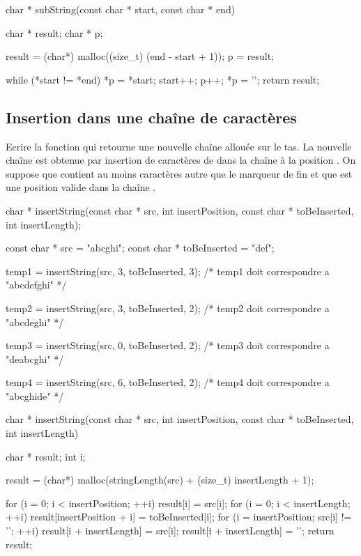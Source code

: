 \begin{csourcecorrection}
char * subString(const char * start, const char * end) {
    char * result;
    char * p;

    result = (char*) malloc((size_t) (end - start + 1));
    p = result;

    while (*start != *end) {
        *p = *start;
        start++;
        p++;
    }
    *p = '\0';
    return result;
}
\end{csourcecorrection}

\subsection{Insertion dans une chaîne de caractères}

Ecrire la fonction  qui retourne une nouvelle chaîne allouée sur le tas. La nouvelle chaîne est obtenue par insertion de  caractères de  dans la chaîne  à la position . On suppose que  contient au moins  caractères autre que le marqueur de fin et que  est une position valide dans la chaîne .
\begin{csource}
char * insertString(const char * src, int insertPosition, const char * toBeInserted, int insertLength);
\end{csource}

\begin{csource}
const char * src = "abcghi";
const char * toBeInserted = "def";

temp1 = insertString(src, 3, toBeInserted, 3);
/* temp1 doit correspondre a "abcdefghi" */

temp2 = insertString(src, 3, toBeInserted, 2);
/* temp2 doit correspondre a "abcdeghi" */

temp3 = insertString(src, 0, toBeInserted, 2);
/* temp3 doit correspondre a "deabcghi" */

temp4 = insertString(src, 6, toBeInserted, 2);
/* temp4 doit correspondre a "abcghide" */
\end{csource}

\begin{csourcecorrection}
char * insertString(const char * src, int insertPosition, const char * toBeInserted,
        int insertLength) {
    char * result;
    int i;

    result = (char*) malloc(stringLength(src) + (size_t) insertLength + 1);

    for (i = 0; i < insertPosition; ++i)
        result[i] = src[i];
    for (i = 0; i < insertLength; ++i)
        result[insertPosition + i] = toBeInserted[i];
    for (i = insertPosition; src[i] != '\0'; ++i)
        result[i + insertLength] = src[i];
    result[i + insertLength] = '\0';
    return result;
}
\end{csourcecorrection}

